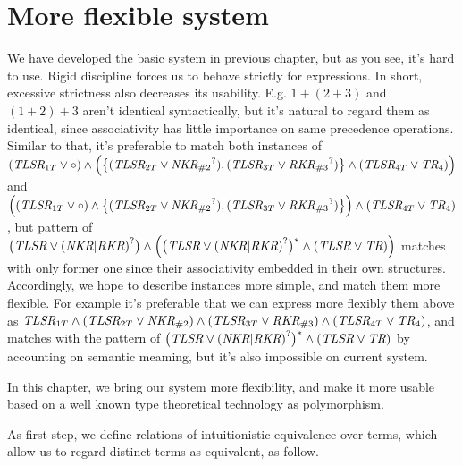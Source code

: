 \documentclass[12pt]{article}
\begin{document}
\section{More flexible system}
We have developed the basic system in previous chapter,
but as you see, it's hard to use. Rigid discipline forces us to behave
strictly for expressions. In short, excessive strictness also
decreases its usability. E.g. $1+(2+3)$ and $(1+2)+3$ aren't identical
syntactically,
but it's natural to regard them as identical, since associativity has little
importance on same precedence operations. Similar to that, it's preferable
to match both instances of
$(\text{\it TLSR}_{1T} \vee \circ) \wedge \Bigl(\bigl\{
(\text{\it TLSR}_{2T} \vee {\text{\it NKR}_{\#2}}^?),
(\text{\it TLSR}_{3T} \vee {\text{\it RKR}_{\#3}}^?)\bigr\} \wedge
(\text{\it TLSR}_{4T} \vee \text{\it TR}_{4}) \Bigr)$ and
$\Bigl((\text{\it TLSR}_{1T} \vee \circ) \wedge \bigl\{
(\text{\it TLSR}_{2T} \vee {\text{\it NKR}_{\#2}}^?),
(\text{\it TLSR}_{3T} \vee {\text{\it RKR}_{\#3}}^?)\bigr\} \Bigr) \wedge
(\text{\it TLSR}_{4T} \vee \text{\it TR}_{4})$, but pattern of
$\bigl(\text{\it TLSR} \vee {(\text{\it NKR} | \text{\it RKR})}^? \bigr)
\wedge \Bigl(\bigl(\text{\it TLSR} \vee {(\text{\it NKR} | \text{\it RKR})}^?
\bigr)^* \wedge (\text{\it TLSR} \vee \text{\it TR}) \Bigr)$
matches with only former one since their associativity embedded in their
own structures. Accordingly, we hope to describe instances more simple, and
match them more flexible. For example it's preferable that we can express
more flexibly them above as
$\text{\it TLSR}_{1T} \wedge (\text{\it TLSR}_{2T} \vee
\text{\it NKR}_{\#2}) \wedge (\text{\it TLSR}_{3T} \vee
\text{\it RKR}_{\#3}) \wedge (\text{\it TLSR}_{4T} \vee
\text{\it TR}_{4})$, and matches with the pattern of
$\bigl(\text{\it TLSR} \vee {(\text{\it NKR} | \text{\it RKR})}^? \bigr)^*
\wedge (\text{\it TLSR} \vee \text{\it TR})$
by accounting on semantic meaming, but it's also impossible on
current system.

In this chapter, we bring our system more flexibility, and make it more
usable based on a well known type theoretical technology as polymorphism.

As first step, we define relations of intuitionistic equivalence over
terms, which allow us to regard distinct terms as equivalent, as follow.
\end{document}
